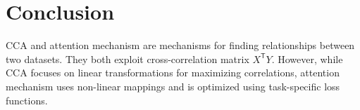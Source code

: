 \documentclass[a4paper,14pt]{article}
\newcommand{\T}{^{\mathsf{T}}}
\theoremstyle{plain} %
\theoremstyle{definition} %
\theoremstyle{remark} %
\begin{document}
	\section*{Conclusion}
	CCA and attention mechanism are mechanisms for finding relationships between two datasets. They both exploit cross-correlation matrix $X\T Y$. However, while CCA focuses on linear transformations for maximizing correlations, attention mechanism uses non-linear mappings and is optimized using task-specific loss functions.
	
	
\end{document}
